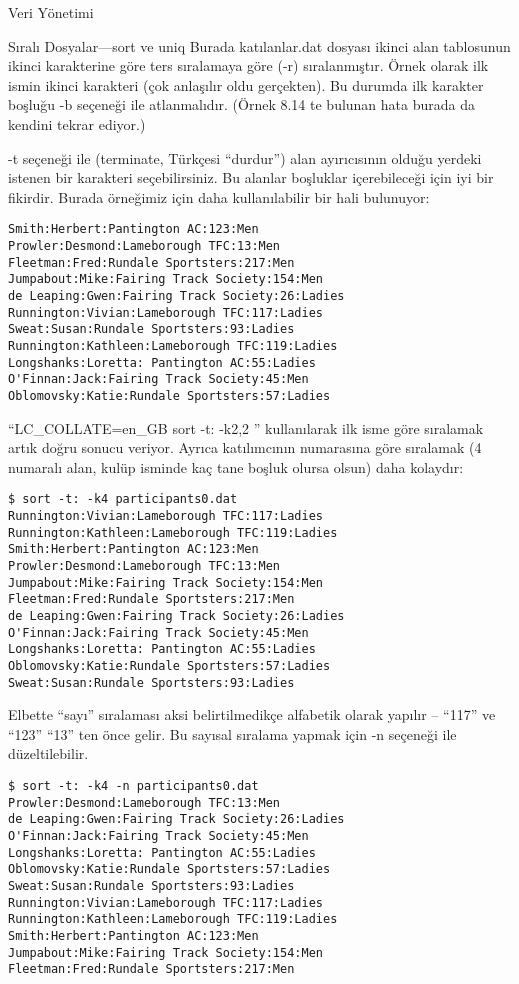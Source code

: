 \begin{section}{Veri Yönetimi}
\begin{subsection}{Sıralı Dosyalar—sort ve uniq}
Burada katılanlar.dat dosyası ikinci alan tablosunun ikinci karakterine göre ters sıralamaya göre (-r) sıralanmıştır. Örnek olarak ilk ismin ikinci karakteri (çok anlaşılır oldu gerçekten). Bu durumda ilk karakter boşluğu -b seçeneği ile atlanmalıdır. (Örnek 8.14 te bulunan hata burada da kendini tekrar ediyor.) 

-t seçeneği ile (terminate, Türkçesi “durdur”) alan ayırıcısının olduğu yerdeki istenen bir karakteri seçebilirsiniz. Bu alanlar boşluklar içerebileceği için iyi bir fikirdir. Burada örneğimiz için daha kullanılabilir bir hali bulunuyor:
\begin{verbatim}
Smith:Herbert:Pantington AC:123:Men
Prowler:Desmond:Lameborough TFC:13:Men
Fleetman:Fred:Rundale Sportsters:217:Men
Jumpabout:Mike:Fairing Track Society:154:Men
de Leaping:Gwen:Fairing Track Society:26:Ladies
Runnington:Vivian:Lameborough TFC:117:Ladies
Sweat:Susan:Rundale Sportsters:93:Ladies
Runnington:Kathleen:Lameborough TFC:119:Ladies
Longshanks:Loretta: Pantington AC:55:Ladies
O'Finnan:Jack:Fairing Track Society:45:Men
Oblomovsky:Katie:Rundale Sportsters:57:Ladies
\end{verbatim}

“LC\_COLLATE=en\_GB sort -t: -k2,2 ” kullanılarak ilk isme göre sıralamak artık doğru sonucu veriyor. Ayrıca katılımcının numarasına göre sıralamak (4 numaralı alan, kulüp isminde kaç tane boşluk olursa olsun) daha kolaydır:
\begin{verbatim}
$ sort -t: -k4 participants0.dat
Runnington:Vivian:Lameborough TFC:117:Ladies
Runnington:Kathleen:Lameborough TFC:119:Ladies
Smith:Herbert:Pantington AC:123:Men
Prowler:Desmond:Lameborough TFC:13:Men
Jumpabout:Mike:Fairing Track Society:154:Men
Fleetman:Fred:Rundale Sportsters:217:Men
de Leaping:Gwen:Fairing Track Society:26:Ladies
O'Finnan:Jack:Fairing Track Society:45:Men
Longshanks:Loretta: Pantington AC:55:Ladies
Oblomovsky:Katie:Rundale Sportsters:57:Ladies
Sweat:Susan:Rundale Sportsters:93:Ladies
\end{verbatim}

Elbette “sayı” sıralaması aksi belirtilmedikçe alfabetik olarak yapılır – “117” ve “123” “13” ten önce gelir. Bu sayısal sıralama yapmak için -n seçeneği ile düzeltilebilir.
\begin{verbatim}
$ sort -t: -k4 -n participants0.dat
Prowler:Desmond:Lameborough TFC:13:Men
de Leaping:Gwen:Fairing Track Society:26:Ladies
O'Finnan:Jack:Fairing Track Society:45:Men
Longshanks:Loretta: Pantington AC:55:Ladies
Oblomovsky:Katie:Rundale Sportsters:57:Ladies
Sweat:Susan:Rundale Sportsters:93:Ladies
Runnington:Vivian:Lameborough TFC:117:Ladies
Runnington:Kathleen:Lameborough TFC:119:Ladies
Smith:Herbert:Pantington AC:123:Men
Jumpabout:Mike:Fairing Track Society:154:Men
Fleetman:Fred:Rundale Sportsters:217:Men
\end{verbatim}


\end{subsection}
\end{section}
